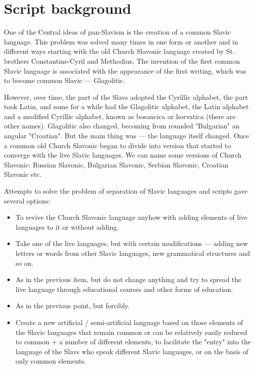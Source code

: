 \section{Script background}

One of the Central ideas of pan-Slavism is the creation of a common Slavic language. This problem was solved many times in one form or another and in different ways starting with the old Church Slavonic language created by St. brothers Constantine-Cyril and Methodius. The invention of the first common Slavic language is associated with the appearance of the first writing, which was to become common Slavic — Glagolitic.

However, over time, the part of the Slavs adopted the Cyrillic alphabet, the part took Latin, and some for a while had the Glagolitic alphabet, the Latin alphabet and a modified Cyrillic alphabet, known as bosancica or horvatica (there are other names). Glagolitic also changed, becoming from rounded "Bulgarian" an angular "Croatian". But the main thing was — the language itself changed. Once a common old Church Slavonic began to divide into version that started to converge with the live Slavic languages. We can name some versions of Church Slavonic: Russian Slavonic, Bulgarian Slavonic, Serbian Slavonic, Croatian Slavonic etc.

Attempts to solve the problem of separation of Slavic languages and scripts gave several options:

\begin{itemize}
	\item To revive the Church Slavonic language anyhow with adding elements of live languages to it or without adding.
	\item Take one of the live languages, but with certain modifications — adding new letters or words from other Slavic languages, new grammatical structures and so on.
	\item As in the previous item, but do not change anything and try to spread the live language through educational courses and other forms of education.
	\item As in the previous point, but forcibly.
	\item Create a new artificial / semi-artificial language based on those elements of the Slavic languages that remain common or can be relatively easily reduced to common + a number of different elements, to facilitate the "entry" into the language of the Slavs who speak different Slavic languages, or on the basis of only common elements.
\end{itemize}

